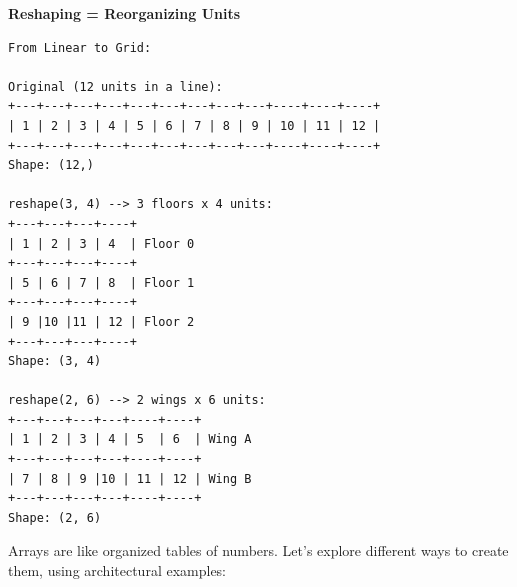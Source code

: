 \begin{tcolorbox}[
    title=Visualizing Arrays as Buildings - cont'd,
    colframe=blue,
    colback = white,
    arc=2mm
    breakable
]
\textbf{Reshaping = Reorganizing Units}
\begin{lstlisting}[basicstyle=\ttfamily\footnotesize,breaklines=true,columns=fullflexible,keepspaces=true,xleftmargin=0pt]
From Linear to Grid:

Original (12 units in a line):
+---+---+---+---+---+---+---+---+---+----+----+----+
| 1 | 2 | 3 | 4 | 5 | 6 | 7 | 8 | 9 | 10 | 11 | 12 |
+---+---+---+---+---+---+---+---+---+----+----+----+
Shape: (12,)

reshape(3, 4) --> 3 floors x 4 units:
+---+---+---+----+
| 1 | 2 | 3 | 4  | Floor 0
+---+---+---+----+
| 5 | 6 | 7 | 8  | Floor 1
+---+---+---+----+
| 9 |10 |11 | 12 | Floor 2
+---+---+---+----+
Shape: (3, 4)

reshape(2, 6) --> 2 wings x 6 units:
+---+---+---+---+----+----+
| 1 | 2 | 3 | 4 | 5  | 6  | Wing A
+---+---+---+---+----+----+
| 7 | 8 | 9 |10 | 11 | 12 | Wing B
+---+---+---+---+----+----+
Shape: (2, 6)

\end{lstlisting}
\end{tcolorbox}


Arrays are like organized tables of numbers. Let's explore different ways to create them, using architectural examples:

